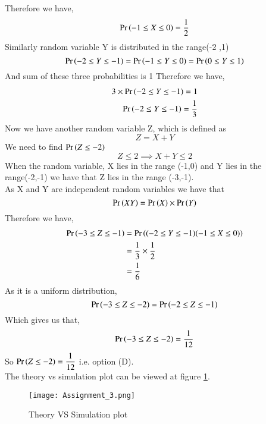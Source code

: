 \documentclass[journal,12pt,twocolumn]{IEEEtran}
\begin{document}
Therefore we have,
\begin{equation}
    \Pr\left(-1 \leq X \leq 0\right) = \dfrac{1}{2}
\end{equation}
Similarly random variable Y is distributed in the range(-2 ,1)
$$\Pr\left(-2 \leq Y \leq -1\right)=\Pr\left(-1 \leq Y \leq 0\right) = \Pr\left(0 \leq Y \leq 1\right) $$
And sum of these three probabilities is 1
Therefore we have,
\begin{align}
    3 \times \Pr\left(-2 \leq Y \leq-1\right) = 1  \\
     \Pr\left(-2 \leq Y \leq-1\right) = \dfrac{1}{3}
\end{align}
Now we have another random variable Z, which is defined as 
\begin{equation}
    Z = X + Y
\end{equation}
We need to find $\Pr\left(Z \leq -2\right)$ 
\begin{equation}
    Z \leq 2 \implies X+Y \leq 2
\end{equation}
When the random variable, X lies in the range (-1,0) and Y lies in the range(-2,-1) we have that Z lies in the range (-3,-1). \\
As X and Y are independent random variables we have that
\begin{equation}
    \Pr\left(XY\right) = \Pr\left(X\right) \times  \Pr\left(Y\right)
\end{equation}
Therefore we have,
\begin{align}
    \Pr\left(-3 \leq Z \leq -1\right) &= \Pr\left((-2 \leq Y \leq -1)(-1 \leq X \leq 0)\right) \\
    &=  \dfrac{1}{3}  \times \dfrac{1}{2}  \\
    &= \dfrac{1}{6}
\end{align}
As it is a uniform distribution,
\begin{equation}
     \Pr\left(-3 \leq Z \leq -2\right)=  \Pr\left(-2 \leq Z \leq -1\right)
\end{equation}
Which gives us that,
\begin{equation}
     \Pr\left(-3 \leq Z \leq -2\right)=  \dfrac{1}{12}
\end{equation}
So $\Pr\left( Z \leq -2\right)=  \dfrac{1}{12}$ i.e. option (D). \\
The theory vs simulation plot can be viewed at figure \ref{Theory VS simulation plot}. 

\begin{figure}[h!]
    \centering
    \texttt{[image: Assignment\_3.png]}
    \caption{Theory VS Simulation plot}
    \label{Theory VS simulation plot}
\end{figure}
\end{document}
